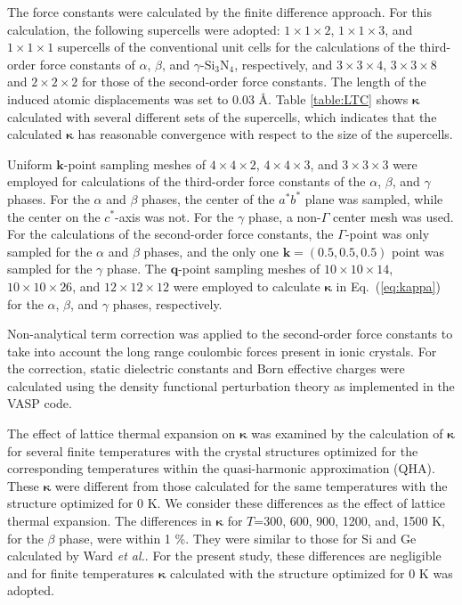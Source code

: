 \documentclass[twocolumn,amsmath,amssymb,a4paper,prb,superscriptaddress,floatfix]{revtex4-1}
\begin{document}
The force constants were calculated by the finite difference
approach\cite{wei-supercell}. For this calculation, the following supercells
were adopted: $1\times 1\times2$, $1\times 1\times3$, and $1\times 1\times1$
supercells of the conventional unit cells for the calculations of the
third-order force constants of $\alpha$, $\beta$, and $\gamma$-Si$_3$N$_4$,
respectively, and $3\times 3\times4$, $3\times 3\times8$ and $2\times 2\times2$
for those of the second-order force constants.  The length of the induced atomic
displacements was set to 0.03 \AA.  Table \ref{table:LTC} shows
$\boldsymbol{\kappa}$ calculated with several different sets of the supercells,
which indicates that the calculated $\boldsymbol{\kappa}$ has reasonable
convergence with respect to the size of the supercells. 

Uniform $\mathbf{k}$-point sampling meshes of $4\times 4\times 2$, $4\times
4\times 3$, and $3\times 3\times 3$ were employed for calculations of the
third-order force constants of the $\alpha$, $\beta$, and $\gamma$ phases. For
the $\alpha$ and $\beta$ phases, the center of the $a^*b^*$ plane was sampled,
while the center on the $c^*$-axis was not. For the $\gamma$ phase, a non-$\Gamma$
center mesh was used. For the calculations of the second-order force constants,
the $\Gamma$-point was only sampled for the $\alpha$ and $\beta$
phases, and the
only one $\mathbf{k}=(0.5, 0.5, 0.5)$ point was sampled for the $\gamma$ phase.
The $\mathbf{q}$-point sampling meshes of $10\times 10\times 14$, $10\times
10\times 26$, and $12\times 12\times 12$ were employed to calculate
$\boldsymbol{\kappa}$ in Eq.~(\ref{eq:kappa}) for the $\alpha$, $\beta$, and
$\gamma$ phases, respectively.

Non-analytical term correction\cite{wang} was applied to the second-order force
constants to take into account the long range coulombic forces present in ionic
crystals. For the correction, static dielectric constants and Born effective
charges were calculated using the density functional perturbation theory
as implemented in the VASP code\cite{vasp-lepsiron,lepsiron}.

The effect of lattice thermal expansion on $\boldsymbol{\kappa}$ was examined
by the calculation of $\boldsymbol{\kappa}$ for several finite
temperatures with the crystal structures optimized for the
corresponding temperatures within the quasi-harmonic approximation
(QHA)\cite{dove-p76}. These $\boldsymbol{\kappa}$ were different from those
calculated for the same temperatures with the structure
optimized for 0 K. We consider these differences as the effect of lattice
thermal expansion. The differences in $\boldsymbol{\kappa}$ for $T$=300, 600,
900, 1200, and, 1500 K, for the $\beta$ phase, were within 1 \%. They 
were similar to those for Si and Ge calculated by Ward {\it{et
al.}}\cite{ward-ltc}.
For the present study, these differences are negligible and
for finite temperatures $\boldsymbol{\kappa}$ calculated with the
structure optimized for 0 K was adopted.
\end{document}
